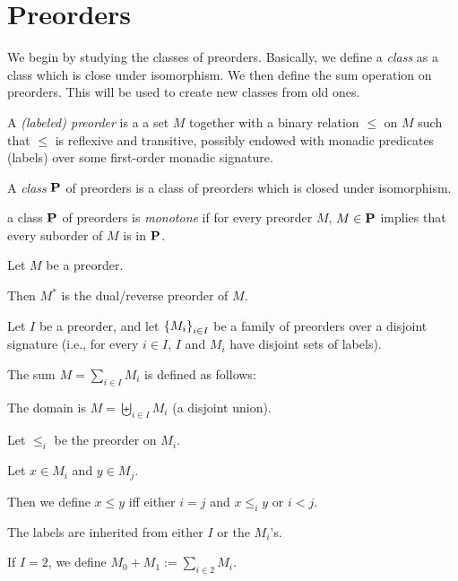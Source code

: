 \section{Preorders}
We begin by studying the classes of preorders. Basically, we define a \emph{class} as a class which is close under
isomorphism. We then define the sum operation on preorders. This will be used to create new classes from old ones.

\begin{definitions} [Preorder]
  A \emph{(labeled) preorder} is a a set $M$
  together with a binary relation $\le$ on $M$ such that
  $\le$ is reflexive and transitive,
  possibly endowed with monadic predicates (labels)
  over some first-order monadic signature.
\end{definitions}

\begin{definition}
  A \emph{class} $\mathbf{P}$ of preorders is a class of preorders which
  is closed under isomorphism.
\end{definition}

\begin{definition}
  a class $\mathbf{P}$ of preorders is \emph{monotone} if for every preorder $M$,
  $M \in \mathbf{P}$ implies that every suborder of $M$ is in $\mathbf{P}$.
\end{definition}

\begin{definition}
  Let $M$ be a preorder.

  Then $M^\ast$ is the dual/reverse preorder of $M$.
\end{definition}

\begin{definition}
  Let $I$ be a preorder, and let $\left\{ {M_i} \right\}_{i \in I}$ be a family of preorders over
  a disjoint signature (i.e., for every $i \in I$, $I$ and $M_i$ have disjoint sets of labels).

  The sum $M = \sum_{i \in I} M_i$ is defined as follows:

  The domain is $M = \biguplus_{i \in I} M_i$ (a disjoint union).

  Let $\le_i$ be the preorder on $M_i$.

  Let $x \in M_i$ and $y \in M_j$.

  Then we define $x \le y$ iff either
  $i = j$ and $x \le_i y$ or $i < j$.

  The labels are inherited from either $I$ or the $M_i$'s.

  If $I = 2$, we define $M_0 + M_1 := \sum_{i \in 2} M_i$.
\end{definition}


